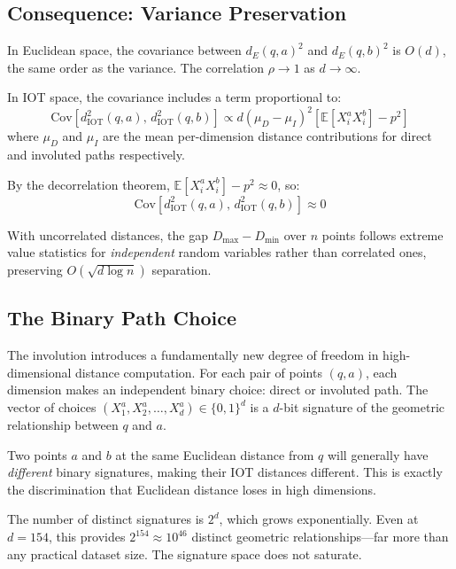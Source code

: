 \subsection{Consequence: Variance Preservation}

In Euclidean space, the covariance between $d_E(q,a)^2$ and $d_E(q,b)^2$ is $O(d)$, the same order as the variance. The correlation $\rho \to 1$ as $d \to \infty$.

In IOT space, the covariance includes a term proportional to:
\begin{equation}
    \text{Cov}[d_{\text{IOT}}^2(q,a), \, d_{\text{IOT}}^2(q,b)] \propto d(\mu_D - \mu_I)^2 [\mathbb{E}[X_i^a X_i^b] - p^2]
\end{equation}
where $\mu_D$ and $\mu_I$ are the mean per-dimension distance contributions for direct and involuted paths respectively.

By the decorrelation theorem, $\mathbb{E}[X_i^a X_i^b] - p^2 \approx 0$, so:
\begin{equation}
    \text{Cov}[d_{\text{IOT}}^2(q,a), \, d_{\text{IOT}}^2(q,b)] \approx 0
\end{equation}

With uncorrelated distances, the gap $D_{\max} - D_{\min}$ over $n$ points follows extreme value statistics for \emph{independent} random variables rather than correlated ones, preserving $O(\sqrt{d \log n})$ separation.

\subsection{The Binary Path Choice}

The involution introduces a fundamentally new degree of freedom in high-dimensional distance computation. For each pair of points $(q, a)$, each dimension makes an independent binary choice: direct or involuted path. The vector of choices $(X_1^a, X_2^a, \ldots, X_d^a) \in \{0, 1\}^d$ is a $d$-bit signature of the geometric relationship between $q$ and $a$.

Two points $a$ and $b$ at the same Euclidean distance from $q$ will generally have \emph{different} binary signatures, making their IOT distances different. This is exactly the discrimination that Euclidean distance loses in high dimensions.

The number of distinct signatures is $2^d$, which grows exponentially. Even at $d = 154$, this provides $2^{154} \approx 10^{46}$ distinct geometric relationships---far more than any practical dataset size. The signature space does not saturate.
